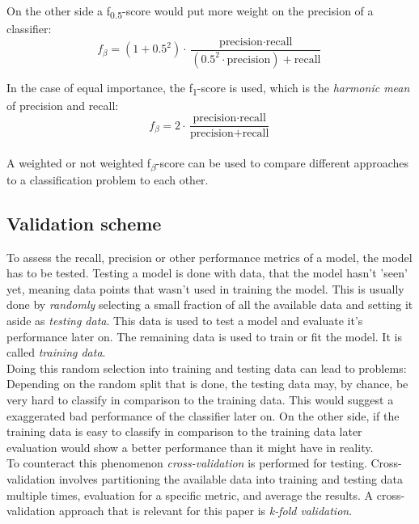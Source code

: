 On the other side a f\textsubscript{0.5}-score  would put more weight on the precision of a classifier:
\begin{equation} \label{eq:ev4}
f_\beta = (1+0.5^2) \cdot \frac{\text{precision} \cdot \text{recall}}{(0.5^2 \cdot \text{precision}) + \text{recall}}
\end{equation}	

In the case of equal importance, the f\textsubscript{1}-score is used, which is the \emph{harmonic mean} of precision and recall:
\begin{equation} \label{eq:ev5}
f_\beta = 2 \cdot \frac{\text{precision} \cdot \text{recall}}{\text{precision} + \text{recall}}
\end{equation}	
\\

A weighted or not weighted f\textsubscript{$\beta$}-score can be used to compare different approaches to a classification problem to each other.
\subsection*{Validation scheme}

To assess the recall, precision or other performance metrics of a model, the model has to be tested. Testing a model is done with data, that the model hasn't 'seen' yet, meaning data points that wasn't used in training the model. This is usually done by \emph{randomly} selecting a small fraction of all the available data and setting it aside as \emph{testing data}. This data is used to test a model and evaluate it's performance later on. The remaining data is used to train or fit the model. It is called \emph{training data}. \\
Doing this random selection into training and testing data can lead to problems: Depending on the random split that is done, the testing data may, by chance, be very hard to classify in comparison to the training data. This would suggest a exaggerated bad performance of the classifier later on. On the other side, if the training data is easy to classify in comparison to the training data later evaluation would show a better performance than it might have in reality.\\
To counteract this phenomenon \emph{cross-validation} is performed for testing. Cross-validation involves partitioning the available data into training and testing data multiple times, evaluation for a specific metric, and average the results. A cross-validation approach that is relevant for this paper is \emph{k-fold validation}.
\\ 

